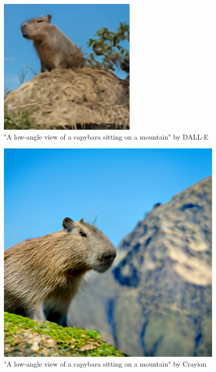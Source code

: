 \documentclass[conference]{IEEEtran}
\begin{document}
\begin{figure}[htbp]
\centerline{\includegraphics[scale=.6]{img/dalle.png}}
\caption{"A low-angle view of a capybara sitting on a mountain" by DALL-E}
\label{dalleimage}
\end{figure}
\begin{figure}[htbp]
\centerline{\includegraphics[scale=.15]{img/dallemini.png}}
\caption{"A low-angle view of a capybara sitting on a mountain" by Crayion}
\label{dalleminiimage}
\end{figure}
\end{document}
